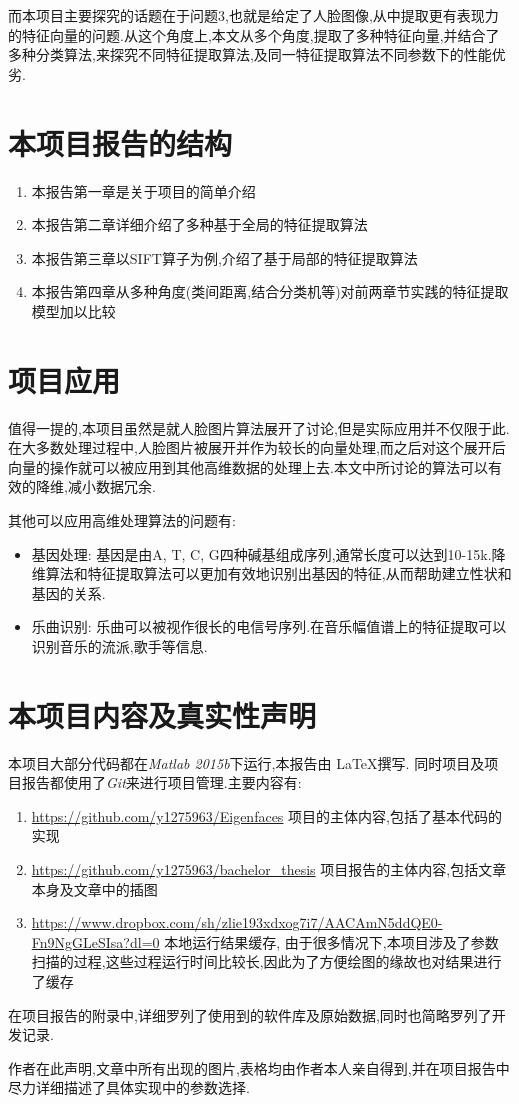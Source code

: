 而本项目主要探究的话题在于问题3,也就是给定了人脸图像,从中提取更有表现力的特征向量的问题.从这个角度上,本文从多个角度,提取了多种特征向量,并结合了多种分类算法,来探究不同特征提取算法,及同一特征提取算法不同参数下的性能优劣.
\section{本项目报告的结构}
\begin{enumerate}
	\item 本报告第一章是关于项目的简单介绍
	\item 本报告第二章详细介绍了多种基于全局的特征提取算法
	\item 本报告第三章以SIFT算子为例,介绍了基于局部的特征提取算法
	\item 本报告第四章从多种角度(类间距离,结合分类机等)对前两章节实践的特征提取模型加以比较
\end{enumerate}

\section{项目应用}
值得一提的,本项目虽然是就人脸图片算法展开了讨论,但是实际应用并不仅限于此.在大多数处理过程中,人脸图片被展开并作为较长的向量处理,而之后对这个展开后向量的操作就可以被应用到其他高维数据的处理上去.本文中所讨论的算法可以有效的降维,减小数据冗余.\newline


其他可以应用高维处理算法的问题有:

\begin{itemize}
	\item{基因处理: } 基因是由A, T, C, G四种碱基组成序列,通常长度可以达到10-15k\cite{twine2011whole}.降维算法和特征提取算法可以更加有效地识别出基因的特征,从而帮助建立性状和基因的关系.
	\item{乐曲识别:} 乐曲可以被视作很长的电信号序列.在音乐幅值谱上的特征提取可以识别音乐的流派,歌手等信息.
\end{itemize}



\section{本项目内容及真实性声明}

本项目大部分代码都在\textit{Matlab 2015b}下运行,本报告由 \LaTeX 撰写. 同时项目及项目报告都使用了\textit{Git}来进行项目管理.主要内容有:
\begin{enumerate}
	\item \url{https://github.com/y1275963/Eigenfaces} 项目的主体内容,包括了基本代码的实现
	\item \url{https://github.com/y1275963/bachelor_thesis} 项目报告的主体内容,包括文章本身及文章中的插图
	\item \url{https://www.dropbox.com/sh/zlie193xdxog7i7/AACAmN5ddQE0-Fn9NgGLeSIsa?dl=0} 本地运行结果缓存, 由于很多情况下,本项目涉及了参数扫描的过程,这些过程运行时间比较长,因此为了方便绘图的缘故也对结果进行了缓存
\end{enumerate}

在项目报告的附录中,详细罗列了使用到的软件库及原始数据,同时也简略罗列了开发记录.\newline


作者在此声明,文章中所有出现的图片,表格均由作者本人亲自得到,并在项目报告中尽力详细描述了具体实现中的参数选择.